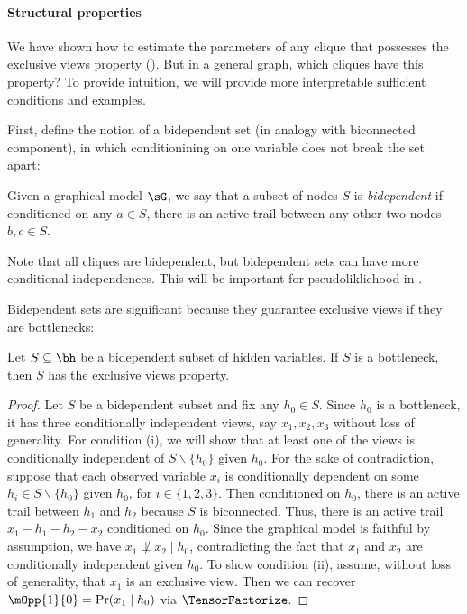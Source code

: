 \paragraph{Structural properties}

We have shown how to estimate the parameters of any clique that possesses the exclusive
  views property ().
  But in a general graph, which cliques have this property?
  To provide intuition, we will provide more interpretable sufficient conditions
  and examples.

First, define the notion of a bidependent set (in analogy with biconnected component),
in which conditionining on one variable does not break the set apart:
\begin{definition}
Given a graphical model $\sG$, we say that a subset of nodes $S$ is \emph{bidependent} if
conditioned on any $a \in S$, there is an active trail between any other two nodes $b,c \in S$.
\end{definition}
Note that all cliques are bidependent, but bidependent sets can have more conditional independences.
This will be important for pseudolikliehood in .

Bidependent sets are significant because they guarantee exclusive views if they are bottlenecks:
\begin{lemma}
  \label{lem:bottleneck-views}  
  Let $S \subseteq \bh$ be a bidependent subset of hidden variables.
  If $S$ is a bottleneck, then $S$ has the exclusive views property.
\end{lemma}
\begin{proof}
Let $S$ be a bidependent subset and fix any $h_0 \in S$.
Since $h_0$ is a bottleneck, it has three conditionally independent views,
say $x_1, x_2, x_3$ without loss of generality. 
For condition (i), we will show that at least one of the views is conditionally independent
of $S \backslash \{ h_0 \}$ given $h_0$.
For the sake of contradiction, 
suppose that each observed variable $x_i$ is conditionally dependent on some
$h_i \in S \backslash \{h_0\}$ given $h_0$, for $i \in \{1, 2, 3\}$.
Then conditioned on $h_0$,
there is an active trail between $h_1$ and $h_2$ because $S$ is biconnected.
Thus, there is an active trail $x_1 - h_1 - h_2 - x_2$ conditioned on $h_0$.
Since the graphical model is faithful by assumption, we have $x_1 \not\perp x_2 \mid h_0$,
contradicting the fact that $x_1$ and $x_2$ are conditionally independent given $h_0$.
To show condition (ii), assume, without loss of generality, that $x_1$ is an exclusive view.
Then we can recover $\mOpp{1}{0} = \Pr(x_1 \mid h_0)$ via $\TensorFactorize$.
\end{proof}

